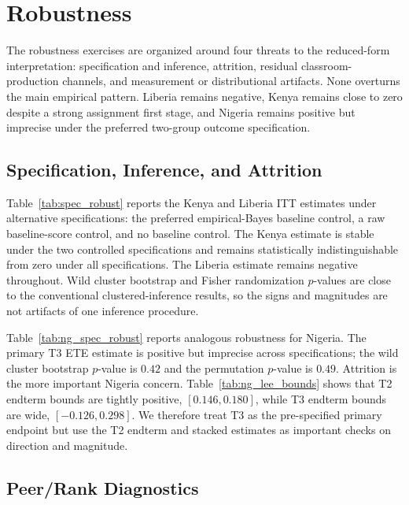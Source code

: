 \documentclass[11pt]{article}
\begin{document}
\section{Robustness}
\label{sec:robustness}

The robustness exercises are organized around four threats to the reduced-form interpretation: specification and inference, attrition, residual classroom-production channels, and measurement or distributional artifacts. None overturns the main empirical pattern. Liberia remains negative, Kenya remains close to zero despite a strong assignment first stage, and Nigeria remains positive but imprecise under the preferred two-group outcome specification.

\subsection{Specification, Inference, and Attrition}

Table~\ref{tab:spec_robust} reports the Kenya and Liberia ITT estimates under alternative specifications: the preferred empirical-Bayes baseline control, a raw baseline-score control, and no baseline control. The Kenya estimate is stable under the two controlled specifications and remains statistically indistinguishable from zero under all specifications. The Liberia estimate remains negative throughout. Wild cluster bootstrap and Fisher randomization $p$-values are close to the conventional clustered-inference results, so the signs and magnitudes are not artifacts of one inference procedure.

Table~\ref{tab:ng_spec_robust} reports analogous robustness for Nigeria. The primary T3 ETE estimate is positive but imprecise across specifications; the wild cluster bootstrap $p$-value is $0.42$ and the permutation $p$-value is $0.49$. Attrition is the more important Nigeria concern. Table~\ref{tab:ng_lee_bounds} shows that T2 endterm bounds are tightly positive, $[0.146,0.180]$, while T3 endterm bounds are wide, $[-0.126,0.298]$. We therefore treat T3 as the pre-specified primary endpoint but use the T2 endterm and stacked estimates as important checks on direction and magnitude.

\subsection{Peer/Rank Diagnostics}
\end{document}
